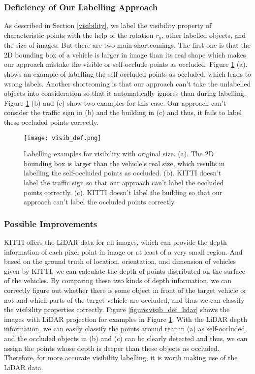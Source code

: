 \subsubsection{Deficiency of Our Labelling Approach}
As described in Section \ref{visibility}, we label the visibility property of characteristic points with the help of the rotation $r_y$, other labelled objects, and the size of images. But there are two main shortcomings. The first one is that the 2D bounding box of a vehicle is larger in image than its real shape which makes our approach mistake the visible or self-occlude points as occluded. Figure \ref{figure:visib_def} (a). shows an example of labelling the self-occluded points as occluded, which leads to wrong labels. Another shortcoming is that our approach can't take the unlabelled objects into consideration so that it automatically ignores than during labelling. Figure \ref{figure:visib_def} (b) and (c) show two examples for this case. Our approach can't consider the traffic sign in (b) and the building in (c) and thus, it fails to label these occluded points correctly.

\begin{figure}[H]		
	\texttt{[image: visib\_def.png]}
	\caption{Labelling examples for visibility with original size. (a). The 2D bounding box is larger than the vehicle's real size, which results in labelling the self-occluded points as occluded. (b). KITTI doesn't label the traffic sign so that our approach can't label the occluded points correctly. (c). KITTI doesn't label the building so that our approach can't label the occluded points correctly.}
	\centering
	\label{figure:visib_def}
\end{figure}

\subsubsection{Possible Improvements}

KITTI offers the LiDAR data for all images, which can provide the depth information of each pixel point in image or at least of a very small region. And based on the ground truth of location, orientation, and dimension of vehicles given by KITTI, we can calculate the depth of points distributed on the surface of the vehicles. By comparing these two kinds of depth information, we can correctly figure out whether there is some object in front of the target vehicle or not and which parts of the target vehicle are occluded, and thus we can classify the visibility properties correctly. Figure \ref{figure:visib_def_lidar} shows the images with LiDAR projection for examples in Figure \ref{figure:visib_def}. With the LiDAR depth information, we can easily classify the points around rear in (a) as self-occluded, and the occluded objects in (b) and (c) can be clearly detected and thus, we can assign the points whose depth is deeper than these objects as occluded. Therefore, for more accurate visibility labelling, it is worth making use of the LiDAR data.

